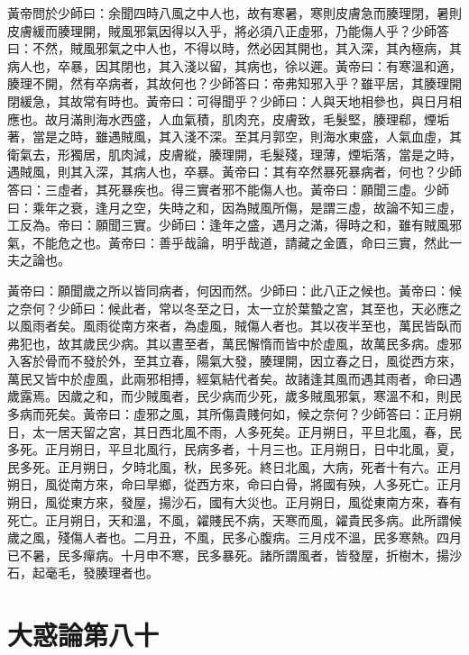 黃帝問於少師曰：余聞四時八風之中人也，故有寒暑，寒則皮膚急而腠理閉，暑則皮膚緩而腠理開，賊風邪氣因得以入乎，將必須八正虛邪，乃能傷人乎？少師答曰：不然，賊風邪氣之中人也，不得以時，然必因其開也，其入深，其內極病，其病人也，卒暴，因其閉也，其入淺以留，其病也，徐以遲。黃帝曰：有寒溫和適，腠理不開，然有卒病者，其故何也？少師答曰：帝弗知邪入乎？雖平居，其腠理開閉緩急，其故常有時也。黃帝曰：可得聞乎？少師曰：人與天地相參也，與日月相應也。故月滿則海水西盛，人血氣積，肌肉充，皮膚致，毛髮堅，腠理郗，煙垢著，當是之時，雖遇賊風，其入淺不深。至其月郭空，則海水東盛，人氣血虛，其衛氣去，形獨居，肌肉減，皮膚縱，腠理開，毛髮殘，理薄，煙垢落，當是之時，遇賊風，則其入深，其病人也，卒暴。黃帝曰：其有卒然暴死暴病者，何也？少師答曰：三虛者，其死暴疾也。得三實者邪不能傷人也。黃帝曰：願聞三虛。少師曰：乘年之衰，逢月之空，失時之和，因為賊風所傷，是謂三虛，故論不知三虛，工反為。帝曰：願聞三實。少師曰：逢年之盛，遇月之滿，得時之和，雖有賊風邪氣，不能危之也。黃帝曰：善乎哉論，明乎哉道，請藏之金匱，命曰三實，然此一夫之論也。

黃帝曰：願聞歲之所以皆同病者，何因而然。少師曰：此八正之候也。黃帝曰：候之奈何？少師曰：候此者，常以冬至之日，太一立於葉蟄之宮，其至也，天必應之以風雨者矣。風雨從南方來者，為虛風，賊傷人者也。其以夜半至也，萬民皆臥而弗犯也，故其歲民少病。其以晝至者，萬民懈惰而皆中於虛風，故萬民多病。虛邪入客於骨而不發於外，至其立春，陽氣大發，腠理開，因立春之日，風從西方來，萬民又皆中於虛風，此兩邪相搏，經氣結代者矣。故諸逢其風而遇其雨者，命曰遇歲露焉。因歲之和，而少賊風者，民少病而少死，歲多賊風邪氣，寒溫不和，則民多病而死矣。黃帝曰：虛邪之風，其所傷貴賤何如，候之奈何？少師答曰：正月朔日，太一居天留之宮，其日西北風不雨，人多死矣。正月朔日，平旦北風，春，民多死。正月朔日，平旦北風行，民病多者，十月三也。正月朔日，日中北風，夏，民多死。正月朔日，夕時北風，秋，民多死。終日北風，大病，死者十有六。正月朔日，風從南方來，命曰旱鄉，從西方來，命曰白骨，將國有殃，人多死亡。正月朔日，風從東方來，發屋，揚沙石，國有大災也。正月朔日，風從東南方來，春有死亡。正月朔日，天和溫，不風，糴賤民不病，天寒而風，糴貴民多病。此所謂候歲之風，殘傷人者也。二月丑，不風，民多心腹病。三月戍不溫，民多寒熱。四月已不暑，民多癉病。十月申不寒，民多暴死。諸所謂風者，皆發屋，折樹木，揚沙石，起毫毛，發腠理者也。


\section{大惑論第八十}


